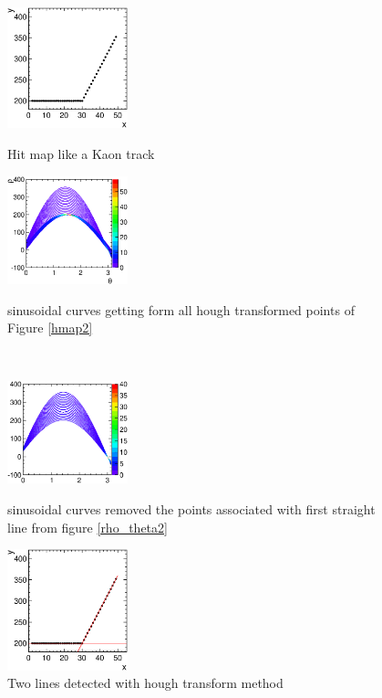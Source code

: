 \begin{figure}[!htb]
  \begin{minipage}{0.5\hsize}
    \begin{center}
      \includegraphics[width=35mm]{fig/hmap2.eps}
    \end{center}
    \caption{Hit map like a Kaon track}
    \label{hmap2}
  \end{minipage}
  \begin{minipage}{0.5\hsize}
    \begin{center}
      \includegraphics[width=35mm]{fig/rho_theta2.eps}
    \end{center}
    \caption{sinusoidal curves getting form all hough transformed  points of Figure \ref{hmap2}}
    \label{rho_theta2}
  \end{minipage}
  \\
  \begin{minipage}{0.5\hsize}
    \begin{center}
      \includegraphics[width=35mm]{fig/rho_theta_kink.eps}
    \end{center}
    \caption{sinusoidal curves removed the points associated with first straight line from figure \ref{rho_theta2}}
    \label{rho_theta3}
  \end{minipage}
  \begin{minipage}{0.5\hsize}
    \begin{center}
      \includegraphics[width=35mm]{fig/hmap_fit.eps}
    \end{center}
    \caption{Two lines detected with hough transform method}
    \label{hmap_fit}
  \end{minipage}
\end{figure}


